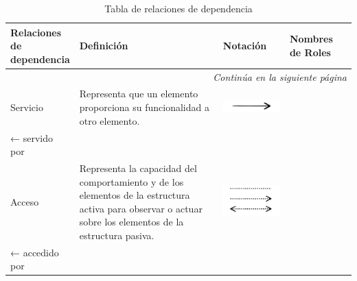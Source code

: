 \begin{longtable}{|p{0.15\linewidth}|p{0.45\linewidth}|p{0.2\linewidth}|p{0.2\linewidth}|}
    \caption{Tabla de relaciones de dependencia} \label{tab:Tabla de relaciones 2} \\
    \hline
    \rowcolor[HTML]{DAE8FC} 
    \textbf{Relaciones de dependencia} & \textbf{Definición} & \textbf{Notación} & \textbf{Nombres de Roles} \\
    \hline
    \endhead %
    \hline
    \multicolumn{4}{r}{\textit{Continúa en la siguiente página}} \\
    \endfoot %
    \hline
    \endlastfoot %

    Servicio &
    Representa que un elemento proporciona su funcionalidad a otro elemento. &
    \begin{center}
        \includegraphics[width=1\linewidth]{imgs/relaciones/servicio.pdf}
    \end{center} &
    \begin{center}
        → sirve \\ ← servido por
    \end{center} \\
    \hline

    Acceso &
    Representa la capacidad del comportamiento y de los elementos de la estructura activa para observar o actuar sobre los elementos de la estructura pasiva. &
    \begin{center}
        \includegraphics[width=1\linewidth]{imgs/relaciones/acceso.pdf}
    \end{center} &
    \begin{center}
        → accesos \\ ← accedido por
    \end{center} \\
    \hline


\end{longtable}
